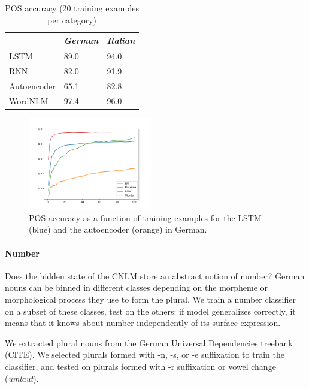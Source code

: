 \begin{table}[t]
  \begin{center}
    \begin{tabular}{l|l|l}
      \multicolumn{1}{c}{}&\emph{German}&\emph{Italian}\\
      \hline
      LSTM & 89.0 & 94.0 \\
      RNN & 82.0 & 91.9 \\
      Autoencoder & 65.1 & 82.8 \\
      WordNLM & 97.4 & 96.0 \\
    \end{tabular}
  \end{center}
  \caption{\label{tab:pos-results} POS accuracy (20 training examples per category)}
\end{table}


\begin{figure}
\includegraphics[width=0.48\textwidth]{figures/german_pos_nouns_verbs.png}
	\caption{POS accuracy as a function of training examples for the LSTM (blue) and the autoencoder (orange) in German.}\label{fig:pos-induction}
\end{figure}





\paragraph{Number}

Does the hidden state of the CNLM store an abstract notion of
number?
German nouns can be binned in different classes depending on
the morpheme or morphological process they use to form the plural. We
train a number classifier on a subset of these classes, test on the
others: if model generalizes correctly, it means that it knows about
number independently of its surface expression.

We extracted plural nouns from the German Universal Dependencies treebank (CITE).
We selected plurals formed with -n, -s, or -e suffixation to train the classifier, and tested on plurals formed with -r suffixation or vowel change (\emph{umlaut}).

